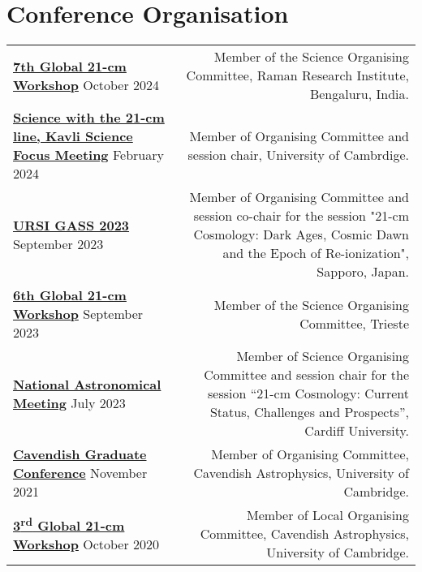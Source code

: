 \documentclass{article}
\begin{document}
\section*{Conference Organisation}

\begin{tabular}{l!{\vrule}r}
    \href{https://sites.google.com/view/global-21-cm-workshop}{\textbf{7th Global 21-cm Workshop}} October 2024 & Member of the Science Organising Committee, Raman Research Institute, Bengaluru, India. \\
    \href{https://www.kicc.cam.ac.uk/events/kavli-science-themed-meetings/science-21-cm-hydrogen-line}{\textbf{Science with the 21-cm line, Kavli Science Focus Meeting}} February 2024 & Member of Organising Committee and session chair, University of Cambrdige. \\
    \href{https://www.ursi-gass2023.jp}{\textbf{URSI GASS 2023}} September 2023 & Member of Organising Committee and session co-chair for the session "21-cm Cosmology: Dark Ages, Cosmic Dawn and the Epoch of Re-ionization", Sapporo, Japan. \\
    \href{https://global21cmworkshop.org/2023-ifpu/}{\textbf{6th Global 21-cm Workshop}} September 2023 & Member of the Science Organising Committee, Trieste \\
    \href{https://nam2023.org}{\textbf{National Astronomical Meeting}} July 2023 & Member of Science Organising Committee and session chair for the session “21-cm Cosmology: Current Status, Challenges and Prospects”, Cardiff University. \\
	\href{http://cavgradcon.soc.srcf.net/index.html}{\textbf{Cavendish Graduate Conference}} November 2021 & Member of Organising Committee, Cavendish Astrophysics, University of Cambridge.\\
	\href{https://sites.google.com/view/third21cmglobalworkshop/home?authuser=0}{\textbf{3\textsuperscript{rd} Global 21-cm Workshop}} October 2020 & Member of Local Organising Committee, Cavendish Astrophysics, University of Cambridge.	
\end{tabular}

\end{document}
